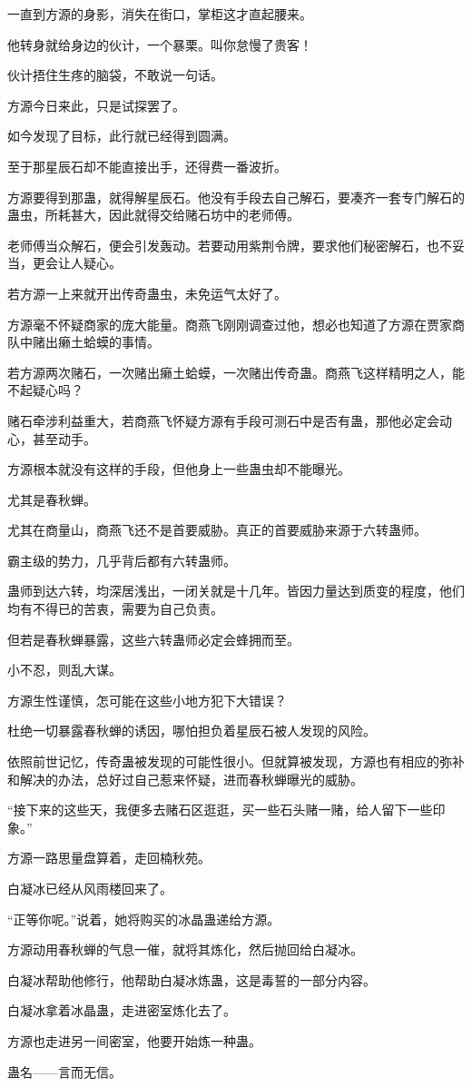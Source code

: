 \begin{this_body}
一直到方源的身影，消失在街口，掌柜这才直起腰来。

他转身就给身边的伙计，一个暴栗。叫你怠慢了贵客！

伙计捂住生疼的脑袋，不敢说一句话。

方源今日来此，只是试探罢了。

如今发现了目标，此行就已经得到圆满。

至于那星辰石却不能直接出手，还得费一番波折。

方源要得到那蛊，就得解星辰石。他没有手段去自己解石，要凑齐一套专门解石的蛊虫，所耗甚大，因此就得交给赌石坊中的老师傅。

老师傅当众解石，便会引发轰动。若要动用紫荆令牌，要求他们秘密解石，也不妥当，更会让人疑心。

若方源一上来就开出传奇蛊虫，未免运气太好了。

方源毫不怀疑商家的庞大能量。商燕飞刚刚调查过他，想必也知道了方源在贾家商队中赌出癞土蛤蟆的事情。

若方源两次赌石，一次赌出癞土蛤蟆，一次赌出传奇蛊。商燕飞这样精明之人，能不起疑心吗？

赌石牵涉利益重大，若商燕飞怀疑方源有手段可测石中是否有蛊，那他必定会动心，甚至动手。

方源根本就没有这样的手段，但他身上一些蛊虫却不能曝光。

尤其是春秋蝉。

尤其在商量山，商燕飞还不是首要威胁。真正的首要威胁来源于六转蛊师。

霸主级的势力，几乎背后都有六转蛊师。

蛊师到达六转，均深居浅出，一闭关就是十几年。皆因力量达到质变的程度，他们均有不得已的苦衷，需要为自己负责。

但若是春秋蝉暴露，这些六转蛊师必定会蜂拥而至。

小不忍，则乱大谋。

方源生性谨慎，怎可能在这些小地方犯下大错误？

杜绝一切暴露春秋蝉的诱因，哪怕担负着星辰石被人发现的风险。

依照前世记忆，传奇蛊被发现的可能性很小。但就算被发现，方源也有相应的弥补和解决的办法，总好过自己惹来怀疑，进而春秋蝉曝光的威胁。

“接下来的这些天，我便多去赌石区逛逛，买一些石头赌一赌，给人留下一些印象。”

方源一路思量盘算着，走回楠秋苑。

白凝冰已经从风雨楼回来了。

“正等你呢。”说着，她将购买的冰晶蛊递给方源。

方源动用春秋蝉的气息一催，就将其炼化，然后抛回给白凝冰。

白凝冰帮助他修行，他帮助白凝冰炼蛊，这是毒誓的一部分内容。

白凝冰拿着冰晶蛊，走进密室炼化去了。

方源也走进另一间密室，他要开始炼一种蛊。

蛊名——言而无信。

\end{this_body}

